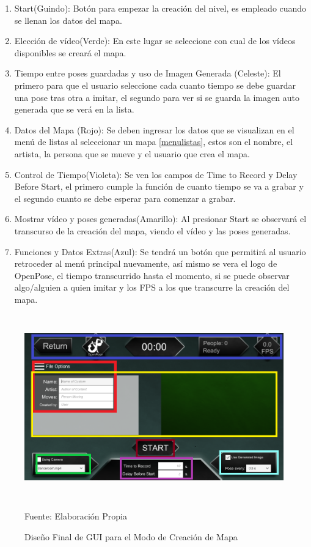 \begin{enumerate}
	\item Start(Guindo): Botón para empezar la creación del nivel, es empleado cuando se llenan los datos del mapa.
	\item Elección de vídeo(Verde): En este lugar se seleccione con cual de los vídeos disponibles se creará el mapa.
	\item Tiempo entre poses guardadas y uso de Imagen Generada (Celeste): El primero para que el usuario seleccione cada cuanto tiempo se debe guardar una pose tras otra a imitar, el segundo para ver si se guarda la imagen auto generada que se verá en la lista.
	\item Datos del Mapa (Rojo): Se deben ingresar los datos que se visualizan en el menú de listas al seleccionar un mapa \ref{menulistas}, estos son el nombre, el artista, la persona que se mueve y el usuario que crea el mapa.
	\item Control de Tiempo(Violeta): Se ven los campos de Time to Record y Delay Before Start, el primero cumple la función de cuanto tiempo se va a grabar y el segundo cuanto se debe esperar para comenzar a grabar.
	\item Mostrar vídeo y poses generadas(Amarillo): Al presionar Start se observará el transcurso de la creación del mapa, viendo el vídeo y las poses generadas.
	\item Funciones y Datos Extras(Azul): Se tendrá un botón que permitirá al usuario retroceder al menú principal nuevamente, así mismo se vera el logo de OpenPose, el tiempo transcurrido hasta el momento, si se puede observar algo/alguien a quien imitar y los FPS a los que transcurre la creación del mapa.
\end{enumerate}


\begin{figure}[h]
	\centering
	\includegraphics[width=14cm,height=8cm,]{./Images/guicrearmapa.png}
	\caption{Diseño Final de GUI para el Modo de Creación de Mapa}
	\footnotesize Fuente: Elaboración Propia
	\label{guicrearmapa}
\end{figure}



